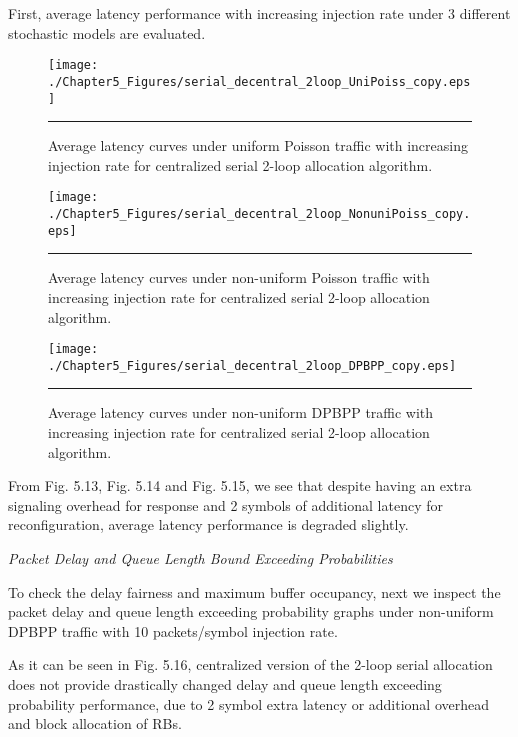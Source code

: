 First, average latency performance with increasing injection rate under 3 different stochastic models are evaluated.
  
\begin{figure}[htbp]
  \centering
    \texttt{[image: ./Chapter5\_Figures/serial\_decentral\_2loop\_UniPoiss\_copy.eps]}
    \rule{35em}{0.5pt}
  \caption[Centralized Serial 2-loop allocation average latency under uniform Poisson]{Average latency curves under uniform Poisson traffic with increasing injection rate for centralized serial 2-loop allocation algorithm.}
  \label{fig:Electron}
\end{figure}


\begin{figure}[htbp]
  \centering
    \texttt{[image: ./Chapter5\_Figures/serial\_decentral\_2loop\_NonuniPoiss\_copy.eps]}
    \rule{35em}{0.5pt}
  \caption[Centralized Serial 2-loop allocation average latency under non-uniform Poisson]{Average latency curves under non-uniform Poisson traffic with increasing injection rate for centralized serial 2-loop allocation algorithm.}
  \label{fig:Electron}
\end{figure}


\begin{figure}[htbp]
  \centering
    \texttt{[image: ./Chapter5\_Figures/serial\_decentral\_2loop\_DPBPP\_copy.eps]}
    \rule{35em}{0.5pt}
  \caption[Centralized Serial 2-loop allocation average latency under non-uniform DPBPP]{Average latency curves under non-uniform DPBPP traffic with increasing injection rate for centralized serial 2-loop allocation algorithm.}
  \label{fig:Electron}
\end{figure}

From Fig. 5.13, Fig. 5.14 and Fig. 5.15, we see that despite having an extra signaling overhead for response and 2 symbols of additional latency for reconfiguration, average latency performance is degraded slightly. 

\textit{Packet Delay and Queue Length Bound Exceeding Probabilities}


To check the delay fairness and maximum buffer occupancy, next we inspect the packet delay and queue length exceeding probability graphs under non-uniform DPBPP traffic with 10 packets/symbol injection rate. 

As it can be seen in Fig. 5.16, centralized version of the 2-loop serial allocation does not provide drastically changed delay and queue length exceeding probability performance, due to 2 symbol extra latency or additional overhead and block allocation of RBs. 


